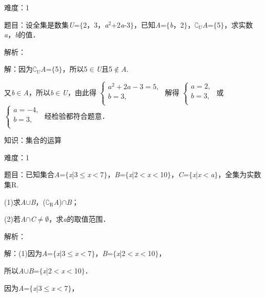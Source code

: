 \documentclass{article} %
\begin{document}
难度：1

题目：设全集是数集\textit{U}=$\mathrm{\{}$2，3，\textit{a}${}^{2}$+2\textit{a}-3$\mathrm{\}}$，已知\textit{A}=$\mathrm{\{}$\textit{b}，2$\mathrm{\}}$，$\mathrm{\complement}$\textit{${}_{U}$A}=$\mathrm{\{}$5$\mathrm{\}}$，求实数\textit{a}，\textit{b}的值．

解析：

解：因为$\mathrm{\complement}$\textit{${}_{U}$A}=$\mathrm{\{}$5$\mathrm{\}}$，所以5$\mathrm{\in}$\textit{U}且5$\mathrm{\notin}$\textit{A}.

又\textit{b}$\mathrm{\in}$\textit{A}，所以\textit{b}$\mathrm{\in}$\textit{U}，由此得
$\left\{
\begin{array}{l}
a^{2}+2a-3=5,\\
b=3,\\
\end{array}
\right.$
解得
$\left\{
\begin{array}{l}
a=2,\\
b=3,\\
\end{array}
\right.$
或
$\left\{
\begin{array}{l}
a=-4,\\
b=3,\\
\end{array}
\right.$
经检验都符合题意．

知识：集合的运算

难度：1

题目：已知集合\textit{A}=$\mathrm{\{}$\textit{x}|3$\mathrm{\le}$\textit{x}$\mathrm{<}$7$\mathrm{\}}$，\textit{B}=$\mathrm{\{}$\textit{x}|2$\mathrm{<}$\textit{x}$\mathrm{<}$10$\mathrm{\}}$，\textit{C}=$\mathrm{\{}$\textit{x}|\textit{x}$\mathrm{<}$\textit{a}$\mathrm{\}}$，全集为实数集R.

(1)求\textit{A}$\mathrm{\cup}$\textit{B}，($\mathrm{\complement_{R}}$\textit{A})$\mathrm{\cap}$\textit{B}；

(2)若\textit{A}$\mathrm{\cap}$\textit{C}$\mathrm{\neq}$$\mathrm{\emptyset}$，求\textit{a}的取值范围．

解析：

解：(1)因为\textit{A}=$\mathrm{\{}$\textit{x}|3$\mathrm{\le}$\textit{x}$\mathrm{<}$7$\mathrm{\}}$，\textit{B}=$\mathrm{\{}$\textit{x}|2$\mathrm{<}$\textit{x}$\mathrm{<}$10$\mathrm{\}}$，

所以\textit{A}$\mathrm{\cup}$\textit{B}=$\mathrm{\{}$\textit{x}|2$\mathrm{<}$\textit{x}$\mathrm{<}$10$\mathrm{\}}$．

因为\textit{A}=$\mathrm{\{}$\textit{x}|3$\mathrm{\le}$\textit{x}$\mathrm{<}$7$\mathrm{\}}$，
\end{document}
